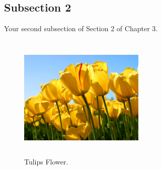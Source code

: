\subsection{\bf Subsection 2}
Your second subsection of Section 2 of Chapter 3.

\begin{figure}[htpb]
\begin{center}
\includegraphics[height=6cm, width=6cm]{figures/Tulips.jpg}
\caption{Tulips Flower.}
\label{fig1.1}
\end{center}
\end{figure}

